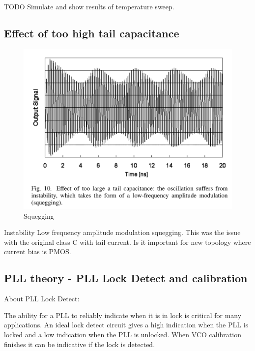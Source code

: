 \documentclass{article}
\begin{document}

TODO Simulate and show results of temperature sweep.


\subsection{Effect of too high tail capacitance}

\begin{figure}[!ht]
	\includegraphics[width=\linewidth]{Figures/squegging.png}
	\caption{Squegging}
	\label{fig:squegging}
\end{figure}

Instability Low frequency amplitude modulation squegging. This was the issue with the original class C with tail current. Is it important for new topology where current bias is PMOS.

\subsection{PLL theory - PLL Lock Detect and calibration}

About PLL Lock Detect:

\begin{info} %
	The ability for a PLL to reliably indicate when it is in lock is critical for many applications. An ideal lock detect circuit gives a high indication when the PLL is locked and a low indication when the PLL is unlocked. When VCO calibration finishes it can be indicative if the lock is detected. 
\end{info}
\end{document}
